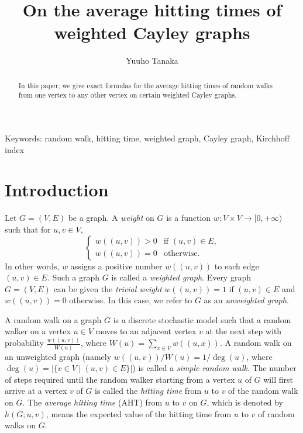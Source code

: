 \documentclass[12pt, leqno]{amsart}
\numberwithin{equation}{section}
\theoremstyle{plain}
\theoremstyle{definition}
\newcommand{\0}{\mathbf{0}}
\begin{document}

\title{On the average hitting times of weighted Cayley graphs}
\author{Yuuho Tanaka}

\address{Faculty of Science and Engineering, Waseda University, Tokyo 169-8555, Japan}
\date{}
\maketitle

\begin{abstract}
In this paper, we give exact formulas for the average hitting times of random walks from one vertex to any other vertex on certain weighted Cayley graphs.
\end{abstract}
\noindent
Keywords: random walk, hitting time, weighted graph, Cayley graph, Kirchhoff index

\section{Introduction}

Let $G=(V,E)$ be a graph.
A {\it weight} on $G$ is a function $w:V\times V\to[0,+\infty )$ such that for $u,v\in V$,
\[
\begin{cases}
w((u,v))>0 &\text{if $(u,v)\in E$,}\\
w((u,v))=0 &\text{otherwise.}
\end{cases}
\]
In other words, $w$ assigns a positive number $w((u,v))$ to each edge $(u,v)\in E$.
Such a graph $G$ is called a {\it weighted graph}.
Every graph $G=(V,E)$ can be given the {\it trivial weight} $w((u,v))=1$ if $(u,v)\in E$ and $w((u,v))=0$ otherwise. 
In this case, we refer to $G$ as an \textit{unweighted graph}.

A random walk on a graph $G$ is a discrete stochastic model
such that a random walker on a vertex $u\in V$ moves to an adjacent vertex $v$ at the next step with probability $\frac{w((u,v))}{W(u)}$, where $W(u)=\sum_{x\in V}w((u,x))$.
A random walk on an unweighted graph (namely $w((u,v))/W(u)=1/\deg(u)$, where $\deg(u)=|\{v\in V \mid (u,v)\in E\}|$) is called a {\it simple random walk}.
The number of steps required until the random walker starting from
a vertex $u$ of $G$ will first arrive at a vertex $v$ of $G$ is called
the {\it hitting time} from $u$ to $v$ of the random walk on $G$.
The {\it average hitting time} (AHT) from $u$ to $v$ on $G$, which is denoted by $h(G;u,v)$, means the expected value of the hitting time
from $u$ to $v$ of random walks on $G$.
\end{document}

